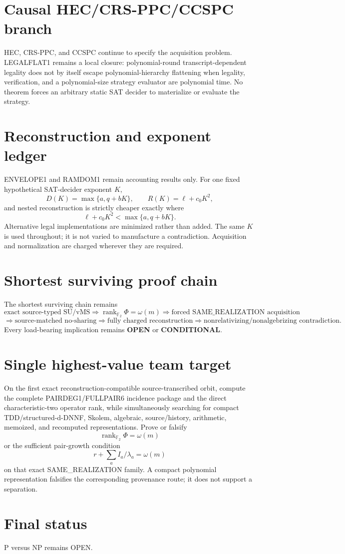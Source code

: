 \documentclass[11pt]{article}
\begin{document}
\section*{Causal HEC/CRS-PPC/CCSPC branch}
HEC, CRS-PPC, and CCSPC continue to specify the acquisition problem. LEGALFLAT1 remains a local closure: polynomial-round transcript-dependent legality does not by itself escape polynomial-hierarchy flattening when legality, verification, and a polynomial-size strategy evaluator are polynomial time. No theorem forces an arbitrary static SAT decider to materialize or evaluate the strategy.

\section*{Reconstruction and exponent ledger}
ENVELOPE1 and RAMDOM1 remain accounting results only. For one fixed hypothetical SAT-decider exponent \(K\),
\[
D(K)=\max\{a,q+bK\},\qquad
R(K)=\ell+c_0K^2,
\]
and nested reconstruction is strictly cheaper exactly where
\[
\ell+c_0K^2<\max\{a,q+bK\}.
\]
Alternative legal implementations are minimized rather than added. The same \(K\) is used throughout; it is not varied to manufacture a contradiction. Acquisition and normalization are charged wherever they are required.

\section*{Shortest surviving proof chain}
The shortest surviving chain remains
\[
\text{exact source-typed SU/vMS}
\Longrightarrow
\operatorname{rank}_{\mathbb F_2}\Phi=\omega(m)
\Longrightarrow
\text{forced SAME\_REALIZATION acquisition}
\]
\[
\Longrightarrow
\text{source-matched no-sharing}
\Longrightarrow
\text{fully charged reconstruction}
\Longrightarrow
\text{nonrelativizing/nonalgebrizing contradiction}.
\]
Every load-bearing implication remains \textbf{OPEN} or \textbf{CONDITIONAL}.

\section*{Single highest-value team target}
On the first exact reconstruction-compatible source-transcribed orbit, compute the complete PAIRDEG1/FULLPAIR6 incidence package and the direct characteristic-two operator rank, while simultaneously searching for compact TDD/structured-d-DNNF, Skolem, algebraic, source/history, arithmetic, memoized, and recomputed representations. Prove or falsify
\[
\boxed{\operatorname{rank}_{\mathbb F_2}\Phi=\omega(m)}
\]
or the sufficient pair-growth condition
\[
\boxed{r+\sum_a I_a/\lambda_a=\omega(m)}
\]
on that exact SAME\_REALIZATION family. A compact polynomial representation falsifies the corresponding provenance route; it does not support a separation.

\section*{Final status}
P versus NP remains OPEN.

\end{document}
